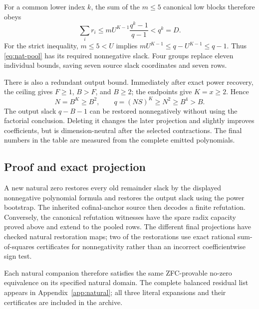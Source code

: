 For a common lower index $k$, the sum of the $m\le5$ canonical low
blocks therefore obeys
\[
\sum_i r_i\le mU^{K-1}\frac{q^k-1}{q-1}<q^k=D.
\]
For the strict inequality, $m\le5<U$ implies
$mU^{K-1}\le q-U^{K-1}\le q-1$. Thus \eqref{eq:nat-pool} has its
required nonnegative slack. Four groups replace eleven individual
bounds, saving seven source slack coordinates and seven rows.

There is also a redundant output bound. Immediately after exact power
recovery, the ceiling gives $F\ge1$, $B>F$, and $B\ge2$; the endpoints
give $K=x\ge2$. Hence
\[
N=B^K\ge B^2,\qquad q=(NS)^K\ge N^2\ge B^4>B.
\]
The output slack $q-B-1$ can be restored nonnegatively without using the
factorial conclusion. Deleting it changes the later projection and
slightly improves coefficients, but is dimension-neutral after the
selected contractions. The final numbers in the table are measured
from the complete emitted polynomials.

\subsection{Proof and exact projection}

A new natural zero restores every old remainder slack by the displayed
nonnegative polynomial formula and restores the output slack using the
power bootstrap. The inherited cofinal-anchor source then decodes a
finite refutation. Conversely, the canonical refutation witnesses have
the spare radix capacity proved above and extend to the pooled rows.
The different final projections have checked natural restoration maps;
two of the restorations use exact rational sum-of-squares certificates
for nonnegativity rather than an incorrect coefficientwise sign test.

Each natural companion therefore satisfies the same ZFC-provable
no-zero equivalence on its specified natural domain. The complete
balanced residual list appears in Appendix~\ref{app:natural}; all three
literal expansions and their certificates are included in the archive.
